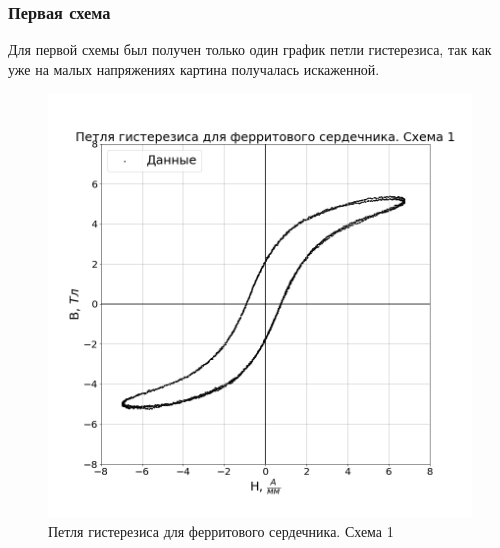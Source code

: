 \documentclass[a4paper,14pt]{extarticle}
\begin{document}
			\subsubsection{Первая схема}
				Для первой схемы был получен только один график петли гистерезиса, так как уже на малых напряжениях картина получалась искаженной. 
				\begin{figure}[h!]
					\includegraphics[width=1.0\linewidth]{Lab2_2.png}
					\caption{Петля гистерезиса для ферритового сердечника. Схема 1}
					\label{fig5}
				\end{figure}
				\newline
\end{document}
